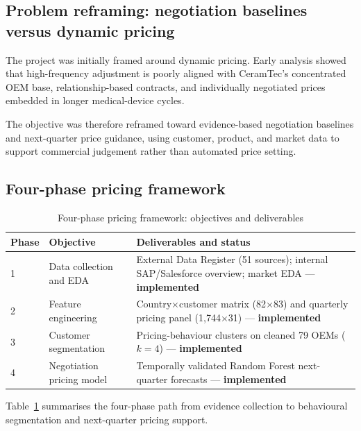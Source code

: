 \documentclass{article}
\begin{document}
\subsection{Problem reframing: negotiation baselines versus dynamic pricing}
\label{sec:reframing}

The project was initially framed around dynamic pricing. Early analysis showed that high-frequency adjustment is poorly aligned with CeramTec's concentrated OEM base, relationship-based contracts, and individually negotiated prices embedded in longer medical-device cycles.

The objective was therefore reframed toward evidence-based negotiation baselines and next-quarter price guidance, using customer, product, and market data to support commercial judgement rather than automated price setting.

\subsection{Four-phase pricing framework}
\label{sec:methodology}

\begin{table}[H]
\centering
\small

\begin{tabular}{@{}p{1.5cm}p{5.0cm}p{9.0cm}@{}}
\toprule
\textbf{Phase} & \textbf{Objective} & \textbf{Deliverables and status} \\
\midrule
1 & Data collection and EDA & External Data Register (51 sources); internal SAP/Salesforce overview; market EDA --- \textbf{implemented} \\
2 & Feature engineering & Country$\times$customer matrix (82$\times$83) and quarterly pricing panel (1{,}744$\times$31) --- \textbf{implemented} \\
3 & Customer segmentation & Pricing-behaviour clusters on cleaned 79 OEMs ($k{=}4$) --- \textbf{implemented} \\
4 & Negotiation pricing model & Temporally validated Random Forest next-quarter forecasts --- \textbf{implemented} \\
\bottomrule
\end{tabular}

\caption{Four-phase pricing framework: objectives and deliverables}
\label{tab:phases}
\end{table}

Table~\ref{tab:phases} summarises the four-phase path from evidence collection to behavioural segmentation and next-quarter pricing support.
\end{document}
